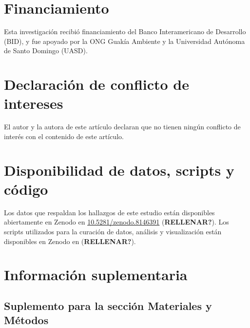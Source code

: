 \documentclass[spanish]{article}
\begin{document}
\hypertarget{financiamiento}{%
\section*{Financiamiento}\label{financiamiento}}

Esta investigación recibió financiamiento del Banco Interamericano de
Desarrollo (BID), y fue apoyado por la ONG Guakía Ambiente y la
Universidad Autónoma de Santo Domingo (UASD).

\hypertarget{declaraciuxf3n-de-conflicto-de-intereses}{%
\section*{Declaración de conflicto de
intereses}\label{declaraciuxf3n-de-conflicto-de-intereses}}

El autor y la autora de este artículo declaran que no tienen ningún
conflicto de interés con el contenido de este artículo.

\hypertarget{disponibilidad-de-datos-scripts-y-cuxf3digo}{%
\section{Disponibilidad de datos, scripts y
código}\label{disponibilidad-de-datos-scripts-y-cuxf3digo}}

Los datos que respaldan los hallazgos de este estudio están disponibles
abiertamente en Zenodo en \url{10.5281/zenodo.8146391}
(\textbf{RELLENAR?}). Los scripts utilizados para la curación de datos,
análisis y visualización están disponibles en Zenodo en \url{}
(\textbf{RELLENAR?}).

\newpage

\hypertarget{infosupl}{%
\section*{Información suplementaria}\label{infosupl}}

\setcounter{table}{0} \renewcommand{\thetable}{S\arabic{table}} \renewcommand\tablename{Tabla} \setcounter{figure}{0} \renewcommand{\thefigure}{S\arabic{figure}} \renewcommand\figurename{Figura}

\hypertarget{suplemento-para-la-secciuxf3n-materiales-y-muxe9todos}{%
\subsection*{Suplemento para la sección Materiales y
Métodos}\label{suplemento-para-la-secciuxf3n-materiales-y-muxe9todos}}
\end{document}
